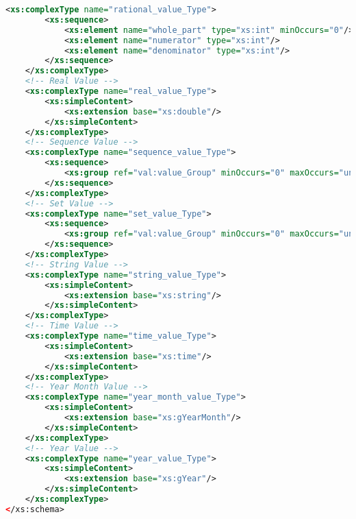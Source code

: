 \begin{lstlisting}[caption=value.xsd, language=XML, label=lst:value_xsd]
	<xs:complexType name="rational_value_Type">
		<xs:sequence>
			<xs:element name="whole_part" type="xs:int" minOccurs="0"/>
			<xs:element name="numerator" type="xs:int"/>
			<xs:element name="denominator" type="xs:int"/>
		</xs:sequence>
	</xs:complexType>
	<!-- Real Value -->
	<xs:complexType name="real_value_Type">
		<xs:simpleContent>
			<xs:extension base="xs:double"/>
		</xs:simpleContent>
	</xs:complexType>
	<!-- Sequence Value -->
	<xs:complexType name="sequence_value_Type">
		<xs:sequence>
			<xs:group ref="val:value_Group" minOccurs="0" maxOccurs="unbounded"/>
		</xs:sequence>
	</xs:complexType>
	<!-- Set Value -->
	<xs:complexType name="set_value_Type">
		<xs:sequence>
			<xs:group ref="val:value_Group" minOccurs="0" maxOccurs="unbounded"/>
		</xs:sequence>
	</xs:complexType>
	<!-- String Value -->
	<xs:complexType name="string_value_Type">
		<xs:simpleContent>
			<xs:extension base="xs:string"/>
		</xs:simpleContent>
	</xs:complexType>
	<!-- Time Value -->
	<xs:complexType name="time_value_Type">
		<xs:simpleContent>
			<xs:extension base="xs:time"/>
		</xs:simpleContent>
	</xs:complexType>
	<!-- Year Month Value -->
	<xs:complexType name="year_month_value_Type">
		<xs:simpleContent>
			<xs:extension base="xs:gYearMonth"/>
		</xs:simpleContent>
	</xs:complexType>
	<!-- Year Value -->
	<xs:complexType name="year_value_Type">
		<xs:simpleContent>
			<xs:extension base="xs:gYear"/>
		</xs:simpleContent>
	</xs:complexType>
</xs:schema>

 \end{lstlisting}  